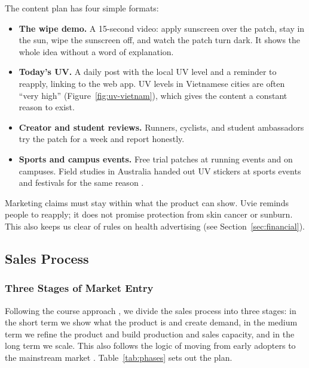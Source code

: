 The content plan has four simple formats:
\begin{itemize}[itemsep=0pt]
  \item \textbf{The wipe demo.} A 15-second video: apply sunscreen over the patch,
    stay in the sun, wipe the sunscreen off, and watch the patch turn dark. It shows
    the whole idea without a word of explanation.
  \item \textbf{Today's UV.} A daily post with the local UV level and a reminder to
    reapply, linking to the web app. UV levels in Vietnamese cities are often
    ``very high'' (Figure~\ref{fig:uv-vietnam}), which gives the content a constant
    reason to exist.
  \item \textbf{Creator and student reviews.} Runners, cyclists, and student
    ambassadors try the patch for a week and report honestly.
  \item \textbf{Sports and campus events.} Free trial patches at running events and on
    campuses. Field studies in Australia handed out UV stickers at sports events and
    festivals for the same reason \cite{horsham2020}.
\end{itemize}

Marketing claims must stay within what the product can show. Uvie reminds people to
reapply; it does not promise protection from skin cancer or sunburn. This also keeps
us clear of rules on health advertising (see Section~\ref{sec:financial}).

\subsection{Sales Process}

\subsubsection{Three Stages of Market Entry}
Following the course approach \cite{aulet2017}, we divide the sales process into
three stages: in the short term we show what the product is and create demand, in
the medium term we refine the product and build production and sales capacity, and
in the long term we scale. This also follows the logic of moving from early
adopters to the mainstream market \cite{moore2014}. Table~\ref{tab:phases} sets out
the plan.

